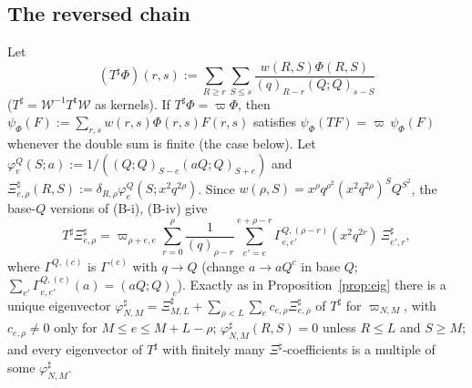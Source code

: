 \documentclass[11pt]{amsart}
\theoremstyle{definition}
\numberwithin{equation}{section}
\begin{document}
\subsection{The reversed chain}\label{ssec:rev}
Let
\[
(T^\sharp\Phi)(r,s):=\sum_{R\ge r}\sum_{S\le s}\frac{w(R,S)\Phi(R,S)}{(q)_{R-r}(Q;Q)_{s-S}}
\]
($T^\sharp=\mathcal W^{-1}T^{\mathsf t}\mathcal W$ as kernels). If $T^\sharp\Phi=\varpi\Phi$, then
$\psi_\Phi(F):=\sum_{r,s}w(r,s)\Phi(r,s)F(r,s)$ satisfies $\psi_\Phi(TF)=\varpi\,\psi_\Phi(F)$ whenever the double sum
is finite (the case below). Let $\varphi^Q_e(S;a):=1/((Q;Q)_{S-e}(aQ;Q)_{S+e})$ and
$\Xi^\sharp_{e,\rho}(R,S):=\delta_{R,\rho}\varphi^Q_e(S;x^2q^{2\rho})$. Since $w(\rho,S)=x^\rho q^{\rho^2}(x^2q^{2\rho})^SQ^{S^2}$, the base-$Q$
versions of (B-i), (B-iv) give
\[
T^\sharp\Xi^\sharp_{e,\rho}=\varpi_{\rho+e,e}\sum_{r=0}^{\rho}\frac1{(q)_{\rho-r}}\sum_{e'=e}^{e+\rho-r}\Gamma^{Q,(\rho-r)}_{e,e'}(x^2q^{2r})\,\Xi^\sharp_{e',r},
\]
where $\Gamma^{Q,(c)}$ is $\Gamma^{(c)}$ with $q\to Q$ (change $a\to aQ^c$ in base $Q$; $\sum_{e'}\Gamma^{Q,(c)}_{e,e'}(a)=(aQ;Q)_c$).
Exactly as in Proposition~\ref{prop:eig} there is a unique eigenvector
$\varphi^\sharp_{N,M}=\Xi^\sharp_{M,L}+\sum_{\rho<L}\sum_ec_{e,\rho}\Xi^\sharp_{e,\rho}$ of $T^\sharp$ for $\varpi_{N,M}$, with
$c_{e,\rho}\ne0$ only for $M\le e\le M+L-\rho$; $\varphi^\sharp_{N,M}(R,S)=0$ unless $R\le L$ and $S\ge M$; and every eigenvector of
$T^\sharp$ with finitely many $\Xi^\sharp$-coefficients is a multiple of some $\varphi^\sharp_{N,M}$.
\end{document}
